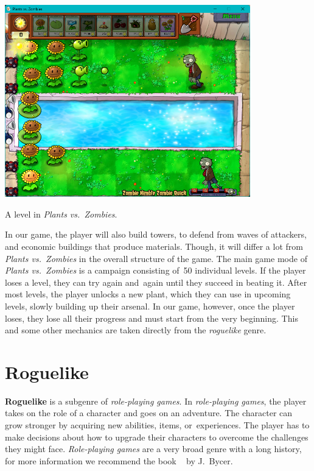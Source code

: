 \begin{center}
    \captionsetup{type=figure}
    \includegraphics[width=0.8\textwidth]{img/Plants-vs-Zombies-Fight.png}
    \caption{A level in \emph{Plants vs.\ Zombies}.}
    \label{fig:pvz-fight}
\end{center}

In our game, the player will also build towers, to defend from waves of attackers, and economic buildings that produce materials.
Though, it will differ a lot from \emph{Plants vs.\ Zombies} in the overall structure of the game.
The main game mode of \emph{Plants vs.\ Zombies} is a campaign consisting of~50 individual levels.
If the player loses a level, they can try again and~again until they succeed in beating it.
After most levels, the player unlocks a new plant, which they can use in upcoming levels, slowly building up their arsenal.
In our game, however, once the player loses, they lose all their progress and must start from the very beginning.
This and some other mechanics are taken directly from the \emph{roguelike} genre.

\section{Roguelike}

\textbf{Roguelike} is a subgenre of \emph{role-playing games}.
In \emph{role-playing games}, the player takes on the role of a character and goes on an adventure.
The character can grow stronger by acquiring new abilities, items, or~experiences.
The player has to make decisions about how to upgrade their characters to overcome the challenges they might face.
\emph{Role-playing games} are a very broad genre with a long history, for more information we recommend the book ~\cite{rpgBycer} by J.~Bycer.

